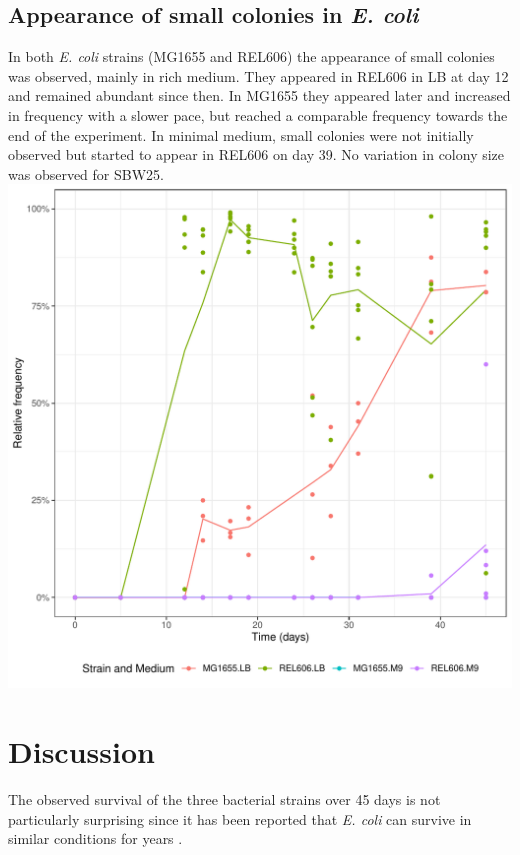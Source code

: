 \documentclass[
    11pt,
    a4paper,
    twoside
]{article} %
\begin{document}
\begin{multicols}{2}
\subsection*{Appearance of small colonies in \textit{E. coli}}
In both \textit{E. coli} strains (MG1655 and REL606) the appearance of small colonies was observed, mainly in rich medium.
They appeared in REL606 in LB at day 12 and remained abundant since then.
In MG1655 they appeared later and increased in frequency with a slower pace, but reached a comparable frequency towards the end of the experiment.
In minimal medium, small colonies were not initially observed but started to appear in REL606 on day 39.
No variation in colony size was observed for SBW25.
\\[2ex]
\includegraphics[width=\columnwidth]{small_plot_report.pdf}
\vspace{2ex}

\section*{Discussion}
The observed survival of the three bacterial strains over 45 days is not particularly surprising since it has been reported that \textit{E. coli} can survive in similar conditions for years \citep{Finkel1999}.


\end{multicols}
\end{document}
